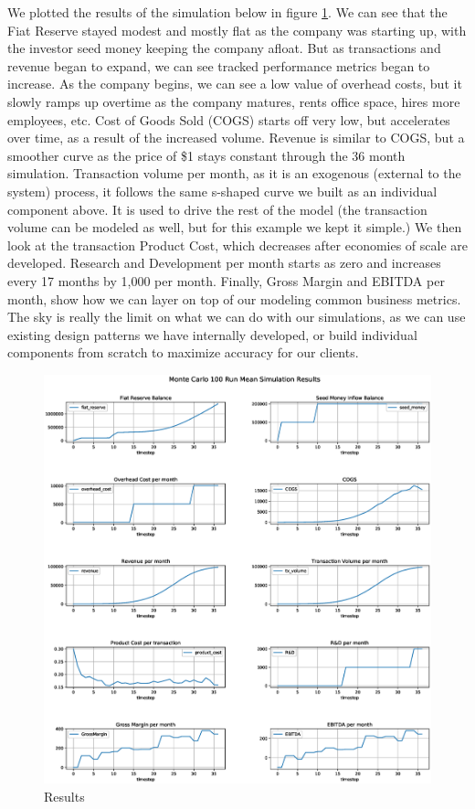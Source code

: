 \documentclass[12pt]{extarticle}
\begin{document}
We plotted the results of the simulation below in figure \ref{fig:results}. We can see that the Fiat Reserve stayed modest and mostly flat as the company was starting up, with the investor seed money keeping the company afloat. But as transactions and revenue began to expand, we can see tracked performance metrics began to increase. As the company begins, we can see a low value of overhead costs, but it slowly ramps up overtime as the company matures, rents office space, hires more employees, etc.  Cost of Goods Sold (COGS) starts off very low, but accelerates over time, as a result of the increased volume. Revenue is similar to COGS, but a smoother curve as the price of \$1 stays constant through the 36 month simulation. Transaction volume per month, as it is an exogenous (external to the system) process, it follows the same s-shaped curve we built as an individual component above. It is used to drive the rest of the model (the transaction volume can be modeled as well, but for this example we kept it simple.) We then look at the transaction Product Cost, which decreases after economies of scale are developed. Research and Development per month starts as zero and increases every 17 months by 1,000 per month. Finally, Gross Margin and EBITDA per month, show how we can layer on top of our modeling common business metrics. The sky is really the limit on what we can do with our simulations, as we can use existing design patterns we have internally developed, or build individual components from scratch to maximize accuracy for our clients. 

\begin{figure}[h]
	\centering
	\includegraphics[width=1\textwidth]{images/Results.eps}
	\caption{Results}
	\label{fig:results}
\end{figure}
\end{document}
